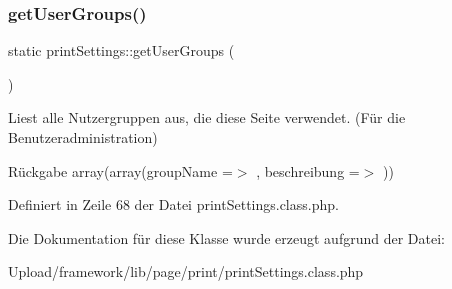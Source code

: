 \subsubsection{\texorpdfstring{get\+User\+Groups()}{getUserGroups()}}
{\footnotesize\ttfamily static print\+Settings\+::get\+User\+Groups (\begin{DoxyParamCaption}{ }\end{DoxyParamCaption})\hspace{0.3cm}{\ttfamily [static]}}

Liest alle Nutzergruppen aus, die diese Seite verwendet. (Für die Benutzeradministration) \begin{DoxyReturn}{Rückgabe}
array(array(\textquotesingle{}group\+Name\textquotesingle{} =$>$ \textquotesingle{}\textquotesingle{}, \textquotesingle{}beschreibung\textquotesingle{} =$>$ \textquotesingle{}\textquotesingle{})) 
\end{DoxyReturn}


Definiert in Zeile 68 der Datei print\+Settings.\+class.\+php.



Die Dokumentation für diese Klasse wurde erzeugt aufgrund der Datei\+:\begin{DoxyCompactItemize}
\item 
Upload/framework/lib/page/print/print\+Settings.\+class.\+php\end{DoxyCompactItemize}
